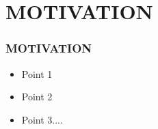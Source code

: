 \documentclass[c]{beamer}
\begin{document}
\section{MOTIVATION}               
\begin{frame} [c]
\frametitle{MOTIVATION}
\begin{itemize}
    \justifying
         \item Point 1
         \item Point 2
         \item Point 3....
    \end{itemize}
   
\end{frame}
	
	
\end{document}
